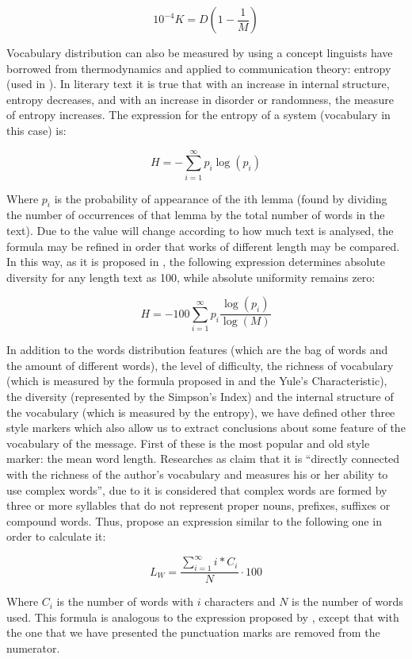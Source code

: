 $$
10^{-4}K=D\left(1-\frac{1}{M}\right)
$$

Vocabulary distribution can also be measured by using a concept linguists have borrowed from thermodynamics and applied to communication theory: entropy (used in \cite{holmes1985analysis}). In literary text it is true that with an increase in internal structure, entropy decreases, and with an increase in disorder or randomness, the measure of entropy increases. The expression for the entropy of a system (vocabulary in this case) is:

$$
H = -\sum_{i=1}^{\infty} p_i\log(p_i)
$$

Where $p_i$ is the probability of appearance of the ith lemma (found by dividing the number of occurrences of that lemma by the total number of words in the text). Due to the value will change according to how much text is analysed, the formula may be refined in order that works of different length may be compared. In this way, as it is proposed in \cite{holmes1985analysis}, the following expression determines absolute diversity for any length text as 100, while absolute uniformity remains zero:

$$
H=-100\sum_{i = 1}^{\infty}p_i\frac{\log(p_i)}{\log(M)}
$$

In addition to the words distribution features (which are the bag of words and the amount of different words), the level of difficulty, the richness of vocabulary (which is measured by the formula proposed in \cite{honore1979some} and the Yule's Characteristic), the diversity (represented by the Simpson's Index) and the internal structure of the vocabulary (which is measured by the entropy), we have defined other three style markers which also allow us to extract conclusions about some feature of the vocabulary of the message. First of these is the most popular and old style marker: the mean word length. Researches as \cite{ril2014determination} claim that it is ``directly connected with the richness of the author's vocabulary and measures his or her ability to use complex words'', due to it is considered that complex words are formed by three or more syllables that do not represent proper nouns, prefixes, suffixes or compound words. Thus, \cite{ril2014determination} propose an expression similar to the following one in order to calculate it:

$$
L_W = \frac{\sum_{i=1}^{\infty}i*C_i}{N}\cdot 100
$$

Where $C_i$ is the number of words with $i$ characters and $N$ is the number of words used. This formula is analogous to the expression proposed by \cite{ril2014determination}, except that with the one that we have presented the punctuation marks are removed from the numerator.

